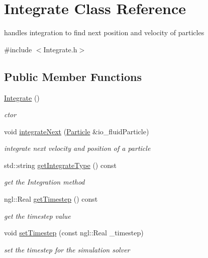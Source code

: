 \hypertarget{class_integrate}{
\section{Integrate Class Reference}
\label{class_integrate}
}


handles integration to find next position and velocity of particles  




{\ttfamily \#include $<$Integrate.h$>$}

\subsection*{Public Member Functions}
\begin{DoxyCompactItemize}
\item 
\hyperlink{class_integrate_af0f7265f78a87be89d07983d0d4806ee}{Integrate} ()
\begin{DoxyCompactList}\small\item\em ctor \item\end{DoxyCompactList}\item 
void \hyperlink{class_integrate_ada967b8b2b909f7c827009dad33738ec}{integrateNext} (\hyperlink{class_particle}{Particle} \&io\_\-fluidParticle)
\begin{DoxyCompactList}\small\item\em integrate next velocity and position of a particle \item\end{DoxyCompactList}\item 
std::string \hyperlink{class_integrate_a3b44dc234ce6802e267ceaaff7379b32}{getIntegrateType} () const 
\begin{DoxyCompactList}\small\item\em get the Integration method \item\end{DoxyCompactList}\item 
ngl::Real \hyperlink{class_integrate_a1dc56e84dd8f2577f068be719d64a36b}{getTimestep} () const 
\begin{DoxyCompactList}\small\item\em get the timestep value \item\end{DoxyCompactList}\item 
void \hyperlink{class_integrate_afc825f2a88811940160aec5243d2d51c}{setTimestep} (const ngl::Real \_\-timestep)
\begin{DoxyCompactList}\small\item\em set the timestep for the simulation solver \item\end{DoxyCompactList}\end{DoxyCompactItemize}
